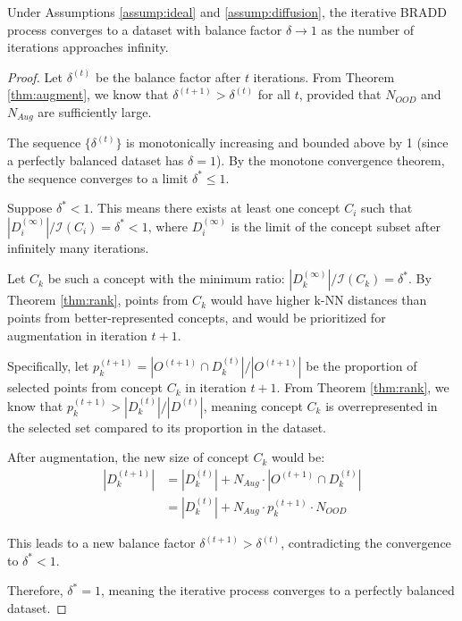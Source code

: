 \begin{theorem}
\label{thm:converge}
\noindent
Under Assumptions \ref{assump:ideal} and \ref{assump:diffusion}, the iterative BRADD process converges to a dataset with balance factor $\delta \rightarrow 1$ as the number of iterations approaches infinity.
\end{theorem}

\begin{proof}
\noindent
Let $\delta^{(t)}$ be the balance factor after $t$ iterations. From Theorem \ref{thm:augment}, we know that $\delta^{(t+1)} > \delta^{(t)}$ for all $t$, provided that $N_{OOD}$ and $N_{Aug}$ are sufficiently large.

\noindent
The sequence $\{\delta^{(t)}\}$ is monotonically increasing and bounded above by 1 (since a perfectly balanced dataset has $\delta = 1$). By the monotone convergence theorem, the sequence converges to a limit $\delta^* \leq 1$.

\noindent
Suppose $\delta^* < 1$. This means there exists at least one concept $C_i$ such that $|D_i^{(\infty)}|/\mathcal{I}(C_i) = \delta^* < 1$, where $D_i^{(\infty)}$ is the limit of the concept subset after infinitely many iterations.

\noindent
Let $C_k$ be such a concept with the minimum ratio: $|D_k^{(\infty)}|/\mathcal{I}(C_k) = \delta^*$. By Theorem \ref{thm:rank}, points from $C_k$ would have higher k-NN distances than points from better-represented concepts, and would be prioritized for augmentation in iteration $t+1$.

\noindent
Specifically, let $p_k^{(t+1)} = |O^{(t+1)} \cap D_k^{(t)}|/|O^{(t+1)}|$ be the proportion of selected points from concept $C_k$ in iteration $t+1$. From Theorem \ref{thm:rank}, we know that $p_k^{(t+1)} > |D_k^{(t)}|/|D^{(t)}|$, meaning concept $C_k$ is overrepresented in the selected set compared to its proportion in the dataset.

\noindent
After augmentation, the new size of concept $C_k$ would be:
\begin{equation}
\begin{aligned}
|D_k^{(t+1)}| &=
|D_k^{(t)}| + N_{Aug} \cdot |O^{(t+1)} \cap D_k^{(t)}|\\
&=
|D_k^{(t)}| + N_{Aug} \cdot p_k^{(t+1)} \cdot N_{OOD}
\end{aligned}
\end{equation}

\noindent
This leads to a new balance factor $\delta^{(t+1)} > \delta^{(t)}$, contradicting the convergence to $\delta^* < 1$.

\noindent
Therefore, $\delta^* = 1$, meaning the iterative process converges to a perfectly balanced dataset.
\end{proof}

